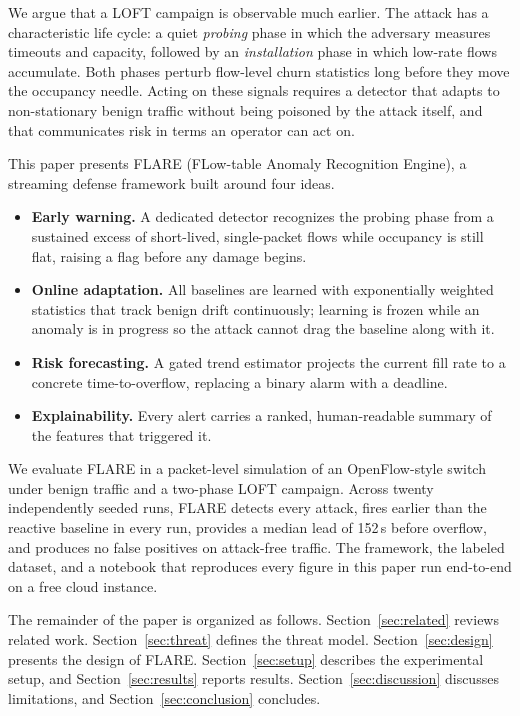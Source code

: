 \documentclass[conference]{IEEEtran}
\begin{document}
We argue that a LOFT campaign is observable much earlier. The attack has a
characteristic life cycle: a quiet \emph{probing} phase in which the adversary
measures timeouts and capacity, followed by an \emph{installation} phase in
which low-rate flows accumulate. Both phases perturb flow-level churn statistics
long before they move the occupancy needle. Acting on these signals requires a
detector that adapts to non-stationary benign traffic without being poisoned by
the attack itself, and that communicates risk in terms an operator can act on.

This paper presents FLARE (FLow-table Anomaly Recognition Engine), a streaming
defense framework built around four ideas.

\begin{itemize}
\item[(i)] \textbf{Early warning.} A dedicated detector recognizes the probing phase
from a sustained excess of short-lived, single-packet flows while occupancy is
still flat, raising a flag before any damage begins.

\item[(ii)] \textbf{Online adaptation.} All baselines are learned with exponentially
weighted statistics that track benign drift continuously; learning is frozen
while an anomaly is in progress so the attack cannot drag the baseline along
with it.

\item[(iii)] \textbf{Risk forecasting.} A gated trend estimator projects the current
fill rate to a concrete time-to-overflow, replacing a binary alarm with a
deadline.

\item[(iv)] \textbf{Explainability.} Every alert carries a ranked, human-readable
summary of the features that triggered it.
\end{itemize}

We evaluate FLARE in a packet-level simulation of an OpenFlow-style switch under
benign traffic and a two-phase LOFT campaign. Across twenty independently seeded
runs, FLARE detects every attack, fires earlier than the reactive baseline in
every run, provides a median lead of 152\,s before overflow, and produces no
false positives on attack-free traffic. The framework, the labeled dataset, and
a notebook that reproduces every figure in this paper run end-to-end on a free
cloud instance.

The remainder of the paper is organized as follows.
Section~\ref{sec:related} reviews related work.
Section~\ref{sec:threat} defines the threat model.
Section~\ref{sec:design} presents the design of FLARE.
Section~\ref{sec:setup} describes the experimental setup, and
Section~\ref{sec:results} reports results.
Section~\ref{sec:discussion} discusses limitations, and
Section~\ref{sec:conclusion} concludes.
\end{document}
